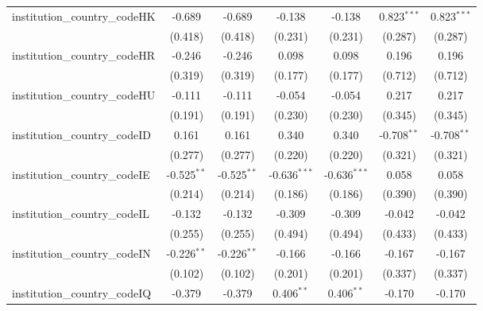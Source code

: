 \begin{tabular}{lcccccc}
   institution\_country\_codeHK          & -0.689         & -0.689         & -0.138         & -0.138         & 0.823$^{***}$  & 0.823$^{***}$\\   
                                         & (0.418)        & (0.418)        & (0.231)        & (0.231)        & (0.287)        & (0.287)\\   
   institution\_country\_codeHR          & -0.246         & -0.246         & 0.098          & 0.098          & 0.196          & 0.196\\   
                                         & (0.319)        & (0.319)        & (0.177)        & (0.177)        & (0.712)        & (0.712)\\   
   institution\_country\_codeHU          & -0.111         & -0.111         & -0.054         & -0.054         & 0.217          & 0.217\\   
                                         & (0.191)        & (0.191)        & (0.230)        & (0.230)        & (0.345)        & (0.345)\\   
   institution\_country\_codeID          & 0.161          & 0.161          & 0.340          & 0.340          & -0.708$^{**}$  & -0.708$^{**}$\\   
                                         & (0.277)        & (0.277)        & (0.220)        & (0.220)        & (0.321)        & (0.321)\\   
   institution\_country\_codeIE          & -0.525$^{**}$  & -0.525$^{**}$  & -0.636$^{***}$ & -0.636$^{***}$ & 0.058          & 0.058\\   
                                         & (0.214)        & (0.214)        & (0.186)        & (0.186)        & (0.390)        & (0.390)\\   
   institution\_country\_codeIL          & -0.132         & -0.132         & -0.309         & -0.309         & -0.042         & -0.042\\   
                                         & (0.255)        & (0.255)        & (0.494)        & (0.494)        & (0.433)        & (0.433)\\   
   institution\_country\_codeIN          & -0.226$^{**}$  & -0.226$^{**}$  & -0.166         & -0.166         & -0.167         & -0.167\\   
                                         & (0.102)        & (0.102)        & (0.201)        & (0.201)        & (0.337)        & (0.337)\\   
   institution\_country\_codeIQ          & -0.379         & -0.379         & 0.406$^{**}$   & 0.406$^{**}$   & -0.170         & -0.170\\   

\end{tabular}

